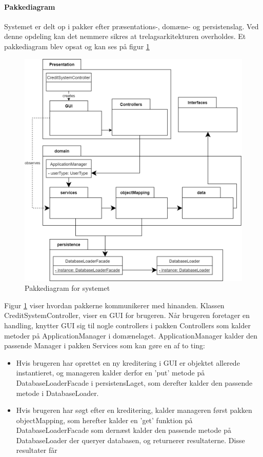 \paragraph{Pakkediagram} Systemet er delt op i pakker efter præsentations-, domæne- og persistenslag. Ved denne opdeling kan det nemmere sikres at trelagsarkitekturen overholdes. Et pakkediagram blev opsat og kan ses på figur \ref{fig:PackageDiagram}

\begin{figure}[H]
    \centering
\includegraphics[scale = 0.3]{images/PackageDiagram.png}
    \caption{Pakkediagram for systemet}
    \label{fig:PackageDiagram}
\end{figure}

Figur \ref{fig:PackageDiagram} viser hvordan pakkerne kommunikerer med hinanden. Klassen CreditSystemController, viser en GUI for brugeren. Når brugeren foretager en handling, knytter GUI sig til nogle controllers i pakken Controllers som kalder metoder på ApplicationManager i domænelaget. ApplicationManager kalder den passende Manager i pakken Services som kan gøre en af to ting: 

\begin{itemize}
    \item Hvis brugeren har oprettet en ny kreditering i GUI er objektet allerede instantieret, og manageren kalder derfor en 'put' metode på DatabaseLoaderFacade i persistensLaget, som derefter kalder den passende metode i DatabaseLoader. 
    \item Hvis brugeren har søgt efter en kreditering, kalder manageren først pakken objectMapping, som herefter kalder en 'get' funktion på DatabaseLoaderFacade som dernæst kalder den passende metode på DatabaseLoader der queryer databasen, og returnerer resultaterne. Disse resultater får 
\end{itemize}




